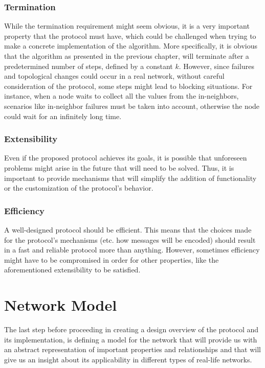 \documentclass[MSc]{icldt}
\begin{document}
\subsubsection*{Termination}

While the termination requirement might seem obvious, it is a very important property that the protocol must have, which could be challenged when trying to make a concrete implementation of the algorithm. More specifically, it is obvious that the algorithm as presented in the previous chapter, will terminate after a predetermined number of steps, defined by a constant $k$. However, since failures and topological changes could occur in a real network, without careful consideration of the protocol, some steps might lead to blocking situations. For instance, when a node waits to collect all the values from the in-neighbors, scenarios like in-neighbor failures must be taken into account, otherwise the node could wait for an infinitely long time.

\subsubsection*{Extensibility}

Even if the proposed protocol achieves its goals, it is possible that unforeseen problems might arise in the future that will need to be solved. Thus, it is important to provide mechanisms that will simplify the addition of functionality or the customization of the protocol's behavior.

\subsubsection*{Efficiency}

A well-designed protocol should be efficient. This means that the choices made for the protocol's mechanisms (etc. how messages will be encoded) should result in a fast and reliable protocol more than anything. However, sometimes efficiency might have to be compromised in order for other properties, like the aforementioned extensibility to be satisfied.


\section{Network Model}

The last step before proceeding in creating a design overview of the protocol and its implementation, is defining a model for the network that will provide us with an abstract representation of important properties and relationships and that will give us an insight about its applicability in different types of real-life networks.
\end{document}
